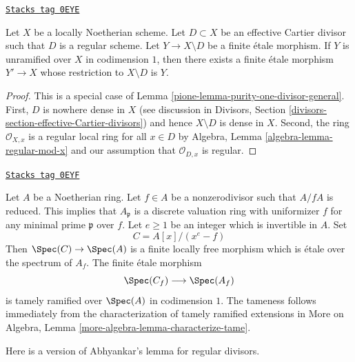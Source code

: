\begin{lemma}
\label{pione-lemma-purity-one-divisor}
\href{https://stacks.math.columbia.edu/tag/0EYE}{\texttt{Stacks tag 0EYE}}

Let $X$ be a locally Noetherian scheme. Let $D \subset X$
be an effective Cartier divisor such that $D$ is a regular scheme.
Let $Y \to X \setminus D$ be a finite \'etale morphism.
If $Y$ is unramified over $X$ in codimension $1$, then
there exists a finite \'etale morphism $Y' \to X$
whose restriction to $X \setminus D$ is $Y$.
\end{lemma}

\begin{proof}

This is a special case of Lemma \ref{pione-lemma-purity-one-divisor-general}.
First, $D$ is nowhere dense in $X$ (see discussion in
Divisors, Section \ref{divisors-section-effective-Cartier-divisors})
and hence $X \setminus D$ is dense in $X$. Second, the ring
$\mathcal{O}_{X, x}$ is a regular local ring for all $x \in D$ by
Algebra, Lemma \ref{algebra-lemma-regular-mod-x}
and our assumption that $\mathcal{O}_{D, x}$ is regular.
\end{proof}

\begin{example}

\label{pione-example-tamely-ramified}
\href{https://stacks.math.columbia.edu/tag/0EYF}{\texttt{Stacks tag 0EYF}}

Let $A$ be a Noetherian ring. Let $f \in A$ be a nonzerodivisor
such that $A/fA$ is reduced. This implies that $A_\mathfrak p$
is a discrete valuation ring with uniformizer $f$ for any
minimal prime $\mathfrak p$ over $f$. Let $e \geq 1$ be an integer which
is invertible in $A$. Set
$$
C = A[x]/(x^e - f)
$$
Then $\Spec(C) \to \Spec(A)$ is a finite locally free morphism
which is \'etale over the spectrum of $A_f$. The finite \'etale morphism
$$
\Spec(C_f) \longrightarrow \Spec(A_f)
$$
is tamely ramified over $\Spec(A)$ in codimension $1$. The
tameness follows immediately from the characterization of tamely ramified
extensions in
More on Algebra, Lemma \ref{more-algebra-lemma-characterize-tame}.
\end{example}

Here is a version of Abhyankar's lemma for regular divisors.

